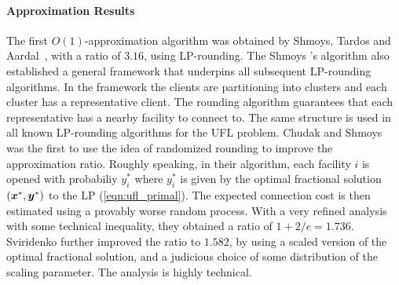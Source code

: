 \documentclass[oneside,final]{ucr}
\begin{document}
\paragraph{Approximation Results}
The first $O(1)$-approximation algorithm was obtained by
Shmoys, Tardos and Aardal~\cite{ShmoysTA97}, with a ratio of
$3.16$, using LP-rounding. The Shmoys {\etal}'s algorithm
also established a general framework that underpins all
subsequent LP-rounding algorithms. In the framework the
clients are partitioning into clusters and each cluster has
a representative client. The rounding algorithm guarantees
that each representative has a nearby facility to connect
to. The same structure is used in all known LP-rounding
algorithms for the UFL problem. Chudak and
Shmoys~\cite{ChudakS04} was the first to use the idea of
randomized rounding to improve the approximation
ratio. Roughly speaking, in their algorithm, each facility
$i$ is opened with probabiliy $y_i^\ast$ where $y_i^\ast$ is
given by the optimal fractional solution
$(\boldsymbol{x}^\ast,\boldsymbol{y}^\ast)$ to the LP
(\ref{eqn:ufl_primal}). The expected connection cost is then
estimated using a provably worse random process. With a very
refined analysis with some technical inequality, they
obtained a ratio of $1+2/e = 1.736$. Sviridenko further
improved the ratio to $1.582$, by using a scaled version of
the optimal fractional solution, and a judicious choice of
some distribution of the scaling parameter. The analysis is
highly technical.
\end{document}
